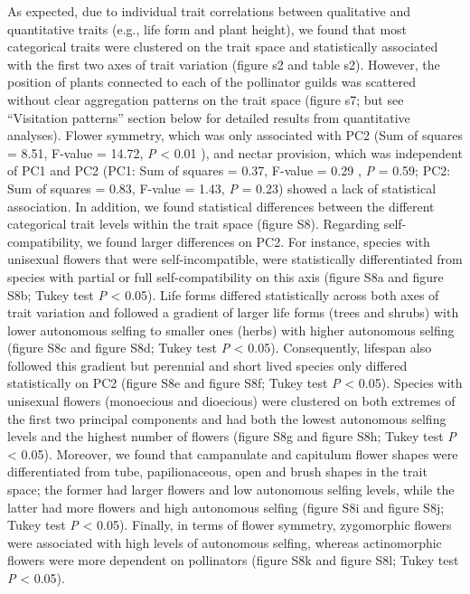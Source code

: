 \documentclass[
  12pt,
  a4paper,
]{article}
\begin{document}
As expected, due to individual trait correlations between qualitative and quantitative traits (e.g., life form and plant height), we found that most categorical traits were clustered on the trait space and statistically associated with the first two axes of trait variation (figure s2 and table s2). However, the position of plants connected to each of the pollinator guilds was scattered without clear aggregation patterns on the trait space (figure s7; but see ``Visitation patterns'' section below for detailed results from quantitative analyses). Flower symmetry, which was only associated with PC2 (Sum of squares = 8.51, F-value = 14.72, \emph{P} \textless{} 0.01 ), and nectar provision, which was independent of PC1 and PC2 (PC1: Sum of squares = 0.37, F-value = 0.29 , \emph{P} = 0.59; PC2: Sum of squares = 0.83, F-value = 1.43, \emph{P} = 0.23) showed a lack of statistical association. In addition, we found statistical differences between the different categorical trait levels within the trait space (figure S8). Regarding self-compatibility, we found larger differences on PC2. For instance, species with unisexual flowers that were self-incompatible, were statistically differentiated from species with partial or full self-compatibility on this axis (figure S8a and figure S8b; Tukey test \emph{P} \textless{} 0.05). Life forms differed statistically across both axes of trait variation and followed a gradient of larger life forms (trees and shrubs) with lower autonomous selfing to smaller ones (herbs) with higher autonomous selfing (figure S8c and figure S8d; Tukey test \emph{P} \textless{} 0.05). Consequently, lifespan also followed this gradient but perennial and short lived species only differed statistically on PC2 (figure S8e and figure S8f; Tukey test \emph{P} \textless{} 0.05). Species with unisexual flowers (monoecious and dioecious) were clustered on both extremes of the first two principal components and had both the lowest autonomous selfing levels and the highest number of flowers (figure S8g and figure S8h; Tukey test \emph{P} \textless{} 0.05). Moreover, we found that campanulate and capitulum flower shapes were differentiated from tube, papilionaceous, open and brush shapes in the trait space; the former had larger flowers and low autonomous selfing levels, while the latter had more flowers and high autonomous selfing (figure S8i and figure S8j; Tukey test \emph{P} \textless{} 0.05). Finally, in terms of flower symmetry, zygomorphic flowers were associated with high levels of autonomous selfing, whereas actinomorphic flowers were more dependent on pollinators (figure S8k and figure S8l; Tukey test \emph{P} \textless{} 0.05).
\end{document}
